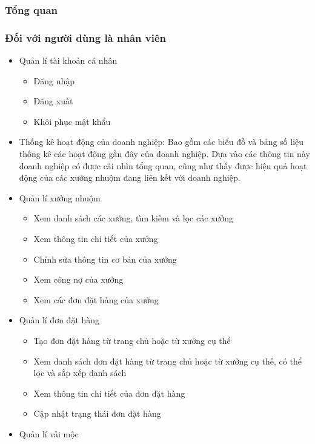 \subsubsection{Tổng quan}


\subsubsection{Đối với người dùng là nhân viên}
\begin{itemize}
    \item Quản lí tài khoản cá nhân
    \begin{itemize}
        \item Đăng nhập
        \item Đăng xuất
        \item Khôi phục mật khẩu
    \end{itemize}
    \item Thống kê hoạt động của doanh nghiệp: 
    Bao gồm các biểu đồ và bảng số liệu thống kê các hoạt động gần đây của doanh nghiệp. Dựa vào các thông tin này doanh nghiệp có được cái nhìn tổng quan, cũng như thấy được hiệu quả hoạt động của các xưởng nhuộm đang liên kết với doanh nghiệp.
    \item Quản lí xưởng nhuộm
    \begin{itemize}
        \item Xem danh sách các xưởng, tìm kiếm và lọc các xưởng
        \item Xem thông tin chi tiết của xưởng
        \item Chỉnh sửa thông tin cơ bản của xưởng
        \item Xem công nợ của xưởng
        \item Xem các đơn đặt hàng của xưởng
    \end{itemize}
    \item Quản lí đơn đặt hàng
    \begin{itemize}
        \item Tạo đơn đặt hàng từ trang chủ hoặc từ xưởng cụ thể
        \item Xem danh sách đơn đặt hàng từ trang chủ hoặc từ xưởng cụ thế, có thể lọc và sắp xếp danh sách
        \item Xem thông tin chi tiết của đơn đặt hàng
        \item Cập nhật trạng thái đơn đặt hàng
    \end{itemize}
    \item Quản lí vải mộc
    \begin{itemize}

\end{itemize}
\end{itemize}
